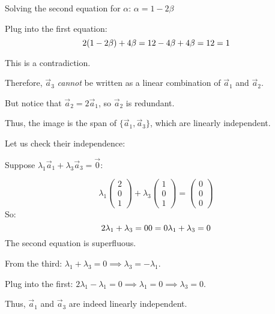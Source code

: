 \documentclass[12pt]{article}
\theoremstyle{definition}
\theoremstyle{plain}
\begin{document}
\begin{enumerate}[label=(\alph*)]
Solving the second equation for \( \alpha \):
\(
\alpha = 1 - 2\beta
\)

Plug into the first equation:
\[
2(1 - 2\beta) + 4\beta = 1 \\
2 - 4\beta + 4\beta = 1 \\
2 = 1
\]

This is a contradiction.

Therefore, \( \vec{a}_3 \) \emph{cannot} be written as a linear combination of \( \vec{a}_1 \) and \( \vec{a}_2 \).

But notice that \( \vec{a}_2 = 2\vec{a}_1 \), so \( \vec{a}_2 \) is redundant.

Thus, the image is the span of \( \{ \vec{a}_1, \vec{a}_3 \} \), which are linearly independent.

Let us check their independence:

Suppose \( \lambda_1 \vec{a}_1 + \lambda_3 \vec{a}_3 = \vec{0} \):

\[
\lambda_1 \begin{pmatrix} 2 \\ 0 \\ 1 \end{pmatrix}
+ \lambda_3 \begin{pmatrix} 1 \\ 0 \\ 1 \end{pmatrix}
= \begin{pmatrix} 0 \\ 0 \\ 0 \end{pmatrix}
\]
So:
\[
2\lambda_1 + \lambda_3 = 0 \\
0 = 0 \\
\lambda_1 + \lambda_3 = 0
\]
The second equation is superfluous.

From the third: \( \lambda_1 + \lambda_3 = 0 \implies \lambda_3 = -\lambda_1 \).

Plug into the first: \( 2\lambda_1 - \lambda_1 = 0 \implies \lambda_1 = 0 \implies \lambda_3=0 \).

Thus, \( \vec{a}_1 \) and \( \vec{a}_3 \) are indeed linearly independent.


\end{enumerate}
\end{document}
